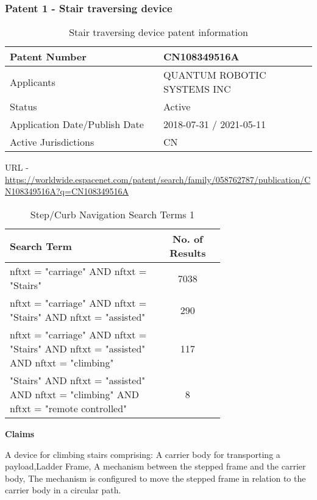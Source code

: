\documentclass [12pt]{article}
\begin{document}
\subsubsection{Patent 1 - Stair traversing device}

\begin{table}[H]
    \centering
    \setlength{\arrayrulewidth}{1.5pt}
    \begin{tabular}{|p{0.5\linewidth}|p{0.5\linewidth}|}
    \hline
    Patent Number & CN108349516A\\
    \hline
    Applicants & QUANTUM ROBOTIC SYSTEMS INC\\
    \hline
    Status & Active\\
    \hline
    Application Date/Publish Date & 2018-07-31 / 2021-05-11\\
    \hline
    Active Jurisdictions & CN\\
    \hline
    \end{tabular}
    \caption{Stair traversing device patent information}
    \label{table:stair_traversing_device_patent_information}
\end{table}

URL - \url{https://worldwide.espacenet.com/patent/search/family/058762787/publication/CN108349516A?q=CN108349516A}

\begin{table}[H]
    \centering
    \setlength{\arrayrulewidth}{1.5pt}
    \begin{tabular}{|p{0.7\linewidth}|c|}
    \hline
    \cellcolor{gray!40}Search Term & \cellcolor{gray!40}No. of Results \\
    \hline
    nftxt = "carriage" AND nftxt = "Stairs" & 7038 \\
    \hline
    nftxt = "carriage" AND nftxt = "Stairs" AND nftxt = "assisted" & 290 \\
    \hline
    nftxt = "carriage" AND nftxt = "Stairs" AND nftxt = "assisted" AND nftxt = "climbing" & 117 \\
    \hline
    "Stairs" AND nftxt = "assisted" AND nftxt = "climbing" AND nftxt = "remote controlled" & 8 \\
    \hline
    \end{tabular}
    \caption{Step/Curb Navigation Search Terms 1}
    \label{table:step_curb_nav_st_1}
\end{table}

\textbf{Claims}

A device for climbing stairs comprising: A carrier body for transporting a payload,Ladder Frame, A mechanism between the stepped frame and the carrier body, The mechanism is configured to move the stepped frame in relation to the carrier body in a circular path.
\end{document}

